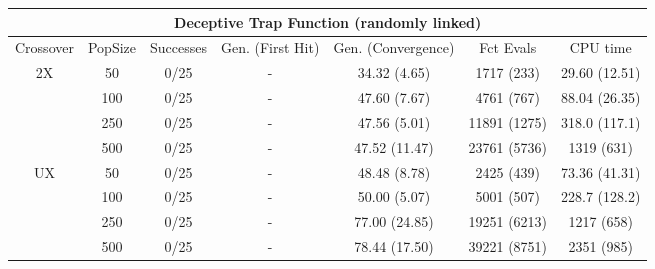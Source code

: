 \documentclass[]{scrartcl}
\begin{document}
\begin{table}
	\small
	\tabcolsep=0.09cm
	\begin{tabular}{|c|c|c|c|c|c|c|}
		\hline
		\multicolumn{7}{|c|}{Deceptive Trap Function (randomly linked)}                                                  \\ \hline
		Crossover           & PopSize & Successes & Gen. (First Hit) & Gen. (Convergence) & Fct Evals    & CPU time      \\ \hline
		\multirow{4}{*}{2X} & 50      & 0/25      & -                & 34.32 (4.65)       & 1717 (233)   & 29.60 (12.51) \\ \cline{2-7} 
		& 100     & 0/25      & -                & 47.60 (7.67)       & 4761 (767)   & 88.04 (26.35) \\ \cline{2-7} 
		& 250     & 0/25      & -                & 47.56 (5.01)       & 11891 (1275) & 318.0 (117.1) \\ \cline{2-7} 
		& 500     & 0/25      & -                & 47.52 (11.47)      & 23761 (5736) & 1319 (631)    \\ \hline
		\multirow{4}{*}{UX} & 50      & 0/25      & -                & 48.48 (8.78)       & 2425 (439)   & 73.36 (41.31) \\ \cline{2-7} 
		& 100     & 0/25      & -                & 50.00 (5.07)       & 5001 (507)   & 228.7 (128.2) \\ \cline{2-7} 
		& 250     & 0/25      & -                & 77.00 (24.85)      & 19251 (6213) & 1217 (658)    \\ \cline{2-7} 
		& 500     & 0/25      & -                & 78.44 (17.50)      & 39221 (8751) & 2351 (985)    \\ \hline
	\end{tabular}
\end{table}
\end{document}

